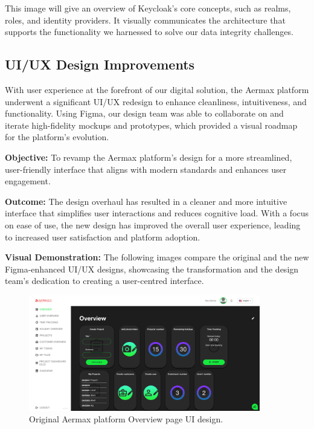 This image will give an overview of Keycloak’s core concepts, such as realms, roles, and identity providers. It visually communicates the architecture that supports the functionality we harnessed to solve our data integrity challenges.


\subsection{UI/UX Design Improvements}
With user experience at the forefront of our digital solution, the Aermax platform underwent a significant UI/UX redesign to enhance cleanliness, intuitiveness, and functionality. Using Figma, our design team was able to collaborate on and iterate high-fidelity mockups and prototypes, which provided a visual roadmap for the platform's evolution.

\textbf{Objective:} To revamp the Aermax platform's design for a more streamlined, user-friendly interface that aligns with modern standards and enhances user engagement.

\textbf{Outcome:} The design overhaul has resulted in a cleaner and more intuitive interface that simplifies user interactions and reduces cognitive load. With a focus on ease of use, the new design has improved the overall user experience, leading to increased user satisfaction and platform adoption.

\textbf{Visual Demonstration:} The following images compare the original and the new Figma-enhanced UI/UX designs, showcasing the transformation and the design team's dedication to creating a user-centred interface.

 

\begin{figure}[H]
    \centering
    \includegraphics[width=0.9\textwidth]{src/assets/chapters/OverviewPage.png}
    \caption{Original Aermax platform Overview page UI design.}
    \label{fig:overview_page_design}
\end{figure}

